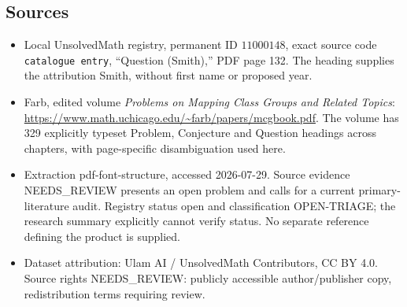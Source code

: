 \documentclass[11pt]{article}
\begin{document}
\subsection{Sources}
\begin{itemize}
\item Local UnsolvedMath registry, permanent ID \(11000148\), exact source code \texttt{catalogue entry}, ``Question (Smith),'' PDF page 132. The heading supplies the attribution Smith, without first name or proposed year.
\item Farb, edited volume \emph{Problems on Mapping Class Groups and Related Topics}: \url{https://www.math.uchicago.edu/~farb/papers/mcgbook.pdf}. The volume has 329 explicitly typeset Problem, Conjecture and Question headings across chapters, with page-specific disambiguation used here.
\item Extraction pdf-font-structure, accessed 2026-07-29. Source evidence NEEDS\_REVIEW presents an open problem and calls for a current primary-literature audit. Registry status open and classification OPEN-TRIAGE; the research summary explicitly cannot verify status. No separate reference defining the product is supplied.
\item Dataset attribution: Ulam AI / UnsolvedMath Contributors, CC BY 4.0. Source rights NEEDS\_REVIEW: publicly accessible author/publisher copy, redistribution terms requiring review.
\end{itemize}
\end{document}
